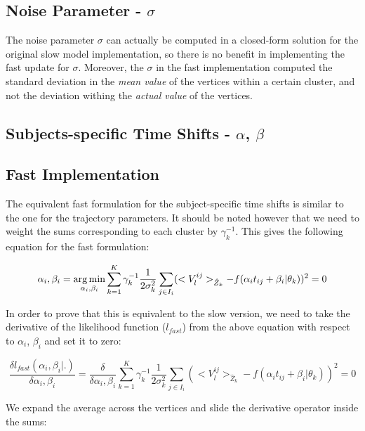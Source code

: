 \subsection{Noise Parameter - $\sigma$}

The noise parameter $\sigma$ can actually be computed in a closed-form solution for the original slow model implementation, so there is no benefit in implementing the fast update for $\sigma$. Moreover, the $\sigma$ in the fast implementation computed the standard deviation in the \emph{mean value} of the vertices within a certain cluster, and not the deviation withing the \emph{actual value} of the vertices.

\subsection{Subjects-specific Time Shifts - $\alpha$, $\beta$}

\subsection{Fast Implementation}

The equivalent fast formulation for the subject-specific time shifts is similar to the one for the trajectory parameters. It should be noted however that we need to weight the sums corresponding to each cluster by $\gamma_{k}^{-1}$. This gives the following equation for the fast formulation:

\begin{equation}
 \alpha_i, \beta_i = \operatorname*{arg\,min}_{\alpha_i, \beta_i}  \sum_{k=1}^K \gamma_k^{-1} \frac{1}{2\sigma_k^2} \sum_{j \in I_i} (<V_l^{ij}>_{\hat{Z}_k} - f(\alpha_i t_{ij} + \beta_i | \theta_k))^2 = 0
\end{equation}

In order to prove that this is equivalent to the slow version, we need to take the derivative of the likelihood function ($l_{fast}$) from the above equation with respect to $\alpha_i$, $\beta_i$ and set it to zero:

\begin{equation}
 \frac{\delta l_{fast}(\alpha_i, \beta_i|.)}{\delta \alpha_i, \beta_i} =  \frac{\delta}{\delta \alpha_i, \beta_i} \sum_{k=1}^K \gamma_k^{-1} \frac{1}{2\sigma_k^2} \sum_{j \in I_i} (<V_l^{ij}>_{\hat{Z}_k} - f(\alpha_i t_{ij} + \beta_i | \theta_k))^2 = 0
\end{equation}

We expand the average across the vertices and slide the derivative operator inside the sums:


